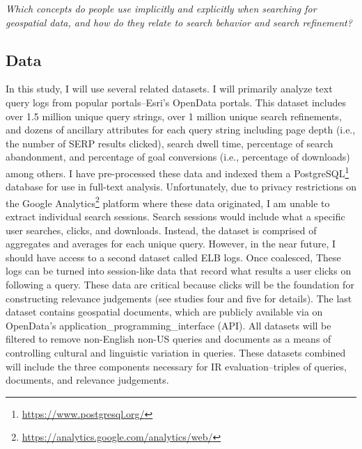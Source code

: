 \emph{Which concepts do people use implicitly and explicitly when searching for geospatial data, and how do they relate to search behavior and search refinement?}


\subsection{Data}
In this study, I will use several related datasets. I will primarily analyze text query logs from popular portals–Esri's OpenData portals. This dataset includes over 1.5 million unique query strings, over 1 million unique search refinements, and dozens of ancillary attributes for each query string including page depth (i.e., the number of SERP results clicked), search dwell time, percentage of search abandonment, and percentage of goal conversions (i.e., percentage of downloads) among others. I have pre-processed these data and indexed them a PostgreSQL\footnote{\url{https://www.postgresql.org/}} database for use in full-text analysis. Unfortunately, due to privacy restrictions on the Google Analytics\footnote{\url{https://analytics.google.com/analytics/web/}} platform where these data originated, I am unable to extract individual search sessions. Search sessions would include what a specific user searches, clicks, and downloads. Instead, the dataset is comprised of aggregates and averages for each unique query. However, in the near future, I should have access to a second dataset called ELB logs. Once coalesced, These logs can be turned into session-like data that record what results a user clicks on following a query. These data are critical because clicks will be the foundation for constructing relevance judgements (see studies four and five for details). The last dataset contains geospatial documents, which are publicly available via on OpenData's \gls{application_programming_interface} (\acrshort{API}). All datasets will be filtered to remove non-English non-US queries and documents as a means of controlling cultural and linguistic variation in queries. These datasets combined will include the three components necessary for IR evaluation–triples of queries, documents, and relevance judgements.

